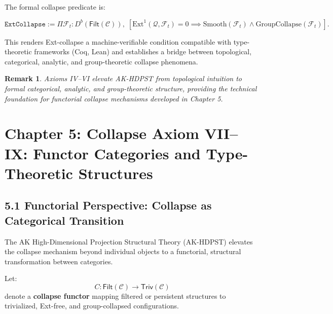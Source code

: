 \documentclass[11pt]{article}
\newtheorem{remark}[theorem]{Remark}
\begin{document}
The formal collapse predicate is:

\[
\texttt{ExtCollapse} := \Pi \mathcal{F}_t : D^b(\mathsf{Filt}(\mathcal{C})),\; \left[
\mathrm{Ext}^1(\mathcal{Q}, \mathcal{F}_t) = 0 \implies \mathrm{Smooth}(\mathcal{F}_t) \wedge \mathrm{GroupCollapse}(\mathcal{F}_t)
\right].
\]

This renders Ext-collapse a machine-verifiable condition compatible with type-theoretic frameworks (Coq, Lean) and establishes a bridge between topological, categorical, analytic, and group-theoretic collapse phenomena.

\begin{remark}
Axioms IV–VI elevate AK-HDPST from topological intuition to formal categorical, analytic, and group-theoretic structure, providing the technical foundation for functorial collapse mechanisms developed in Chapter 5.
\end{remark}



\section{Chapter 5: Collapse Axiom VII--IX: Functor Categories and Type-Theoretic Structures }

\subsection*{5.1 Functorial Perspective: Collapse as Categorical Transition}

The AK High-Dimensional Projection Structural Theory (AK-HDPST) elevates the collapse mechanism beyond individual objects to a functorial, structural transformation between categories.

Let:
\[
C: \mathsf{Filt}(\mathcal{C}) \longrightarrow \mathsf{Triv}(\mathcal{C})
\]
denote a \textbf{collapse functor} mapping filtered or persistent structures to trivialized, Ext-free, and group-collapsed configurations.
\end{document}
